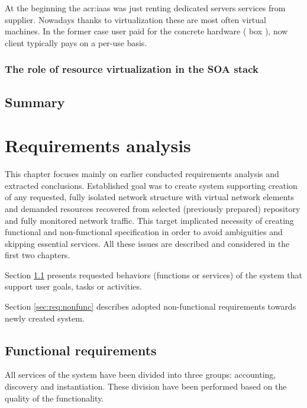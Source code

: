 \documentclass[11pt]{book}
\begin{document}
        At the beginning the \gls{acr:iaas} was just renting dedicated servers services from supplier. Nowadays thanks to
        virtualization these are most often virtual machines. In the former case user paid for the concrete hardware
        ( box ), now client typically pays on a per-use basis.


      \subsection{The role of resource virtualization in the SOA stack}


    \section*{Summary}


  \chapter{Requirements analysis}


    This chapter focuses mainly on earlier conducted requirements analysis and extracted conclusions. Established goal
    was to create system supporting creation of any requested, fully isolated network structure with virtual network
    elements and demanded resources recovered from selected (previously prepared) repository and fully monitored network
    traffic. This target implicated necessity of creating functional and non-functional specification in order to avoid
    ambiguities and skipping essential services. All these issues are described and considered in the first two
    chapters.

    Section \ref{sec:req:func} presents requested behaviors (functions or services) of the system that support user
    goals, tasks or activities.

    Section \ref{sec:req:nonfunc} describes adopted non-functional requirements towards newly created system.


    \section{Functional requirements}
	
		\label{sec:req:func}
		
		All services of the system have been divided into three groups: accounting, discovery and instantiation.
                These division have been performed based on the quality of the functionality.  
\end{document}
